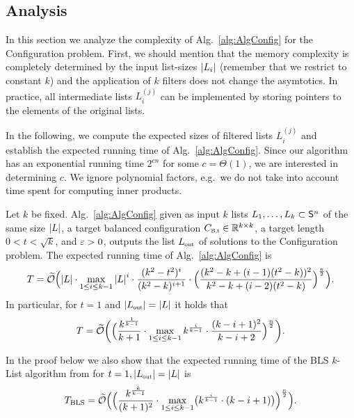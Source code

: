 \subsection{Analysis} \label{subsec:KListAnalysisL2}

In this section we analyze the complexity of Alg.~\ref{alg:AlgConfig} for the Configuration problem. First, we should mention that the memory complexity is completely determined by the input list-sizes $\left|L_i\right|$ (remember that we restrict to constant $k$) and the application of $k$ filters does not change the asymtotics. In practice, all intermediate lists $L_i^{(j)}$ can be implemented by storing pointers to the elements of the original lists. 

In the following, we compute the expected sizes of filtered lists $L_i^{(j)}$ and establish the expected running time of Alg.~\ref{alg:AlgConfig}. Since our algorithm has an exponential running time $2^{cn}$ for some $c = \Theta(1)$, we are interested in determining $c$. We ignore polynomial factors, e.g.\ we do not take into account time spent for computing inner products. 

\begin{thm}\label{thm:RunTimeAlg1}
Let $k$ be fixed. Alg.~\ref{alg:AlgConfig} given as input $k$ lists $L_1, \ldots, L_k \subset \mathsf{S}^{n}$ of the same size $\left|L\right|$, a target balanced configuration $\Cbalt \in \R^{k \times k}$, a target length $0 < t < \sqrt{k}$, and $\varepsilon > 0$, outputs the list $\Lout$ of solutions to the Configuration problem. The expected running time of Alg.~\ref{alg:AlgConfig} is
	\begin{equation}\label{eq:RunTime}
	 T =  \widetilde{\mathcal{O}} \Bigl( \left|L\right| \cdot \max\limits_{1 \leq i \leq k-1}  \left|L\right|^i \cdot \frac{(k^2-t^2)^i}{(k^2-k)^{i+1}}  \cdot \Bigl( \frac{(k^2 - k + (i-1)(t^2-k))^2}{k^2 - k +(i-2)(t^2-k)} \Bigr)^{\frac{n}{2}} \Bigr).
  \end{equation}
In particular, for $t=1$ and $\abs{\Lout} = \abs{L}$ it holds that
  \begin{equation}\label{eq:RunTime=1}
	 T = \widetilde{\mathcal{O}} \biggl( \Bigl( \frac{k^{ \frac{1}{k-1} }}{k+1} \cdot  \max\limits_{1 \leq i \leq k-1} k^{\frac{i}{k-1}} \cdot \frac{(k-i+1)^2}{k-i+2}  \Bigr)^{\frac{n}{2}} \biggr).
  \end{equation}
\end{thm}

\begin{remark}\label{rmk:RunningTimeOfBLS} In the proof below we also show that the expected running time of 
the BLS
$k$-List algorithm 
from \cite{BLS16} for $t=1,\abs{\Lout}=\abs{L}$ is
\begin{equation} \label{eq:RunTimeBLS}
	T_{\text{BLS}} = \widetilde{\mathcal{O}} \Bigl(  \Bigl( \frac{k^{\frac{k}{k-1}}}{(k+1)^2} \cdot \max\limits_{1 \leq i \leq k-1} \bigl( k^{\frac{i}{k-1}} \cdot (k-i+1) \bigr)\Bigr)^{\frac{n}{2}} \Bigr).
\end{equation}
\end{remark} 

